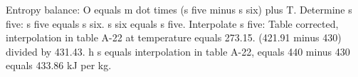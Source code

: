 Entropy balance:  
O equals m dot times (s five minus s six) plus T.  
Determine s five:  
s five equals s six.  
s six equals s five.  
Interpolate s five:  
Table corrected, interpolation in table A-22 at temperature equals 273.15.  
(421.91 minus 430) divided by 431.43.  
h s equals interpolation in table A-22,  
equals 440 minus 430  
equals 433.86 kJ per kg.